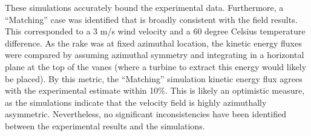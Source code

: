 These simulations accurately bound the experimental data. Furthermore, a
``Matching'' case was identified that is broadly consistent with the
field results. This corresponded to a 3 m/s wind velocity and a 60
degree Celsius temperature difference. 
As the rake was at fixed azimuthal location, the kinetic energy fluxes were
compared by assuming azimuthal symmetry and integrating in a horizontal
plane at the top of the vanes (where a turbine to extract this energy
would likely be placed). By this metric, the ``Matching'' simulation
kinetic energy flux agrees with the experimental estimate within
10\%. This is likely an optimistic measure, as the simulations indicate
that the velocity field is highly azimuthally asymmetric. Nevertheless,
no significant inconsistencies have been identified between the
experimental results and the simulations. 

%
% 
%
% 
%
%
%
%
